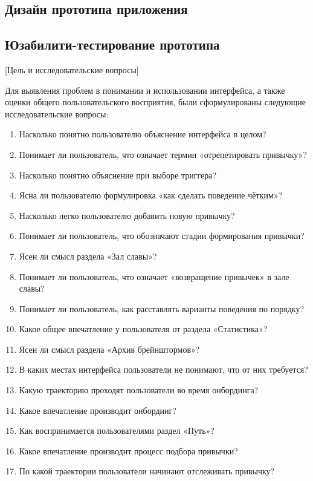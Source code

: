 \documentclass[pdflatex,sn-mathphys-num]{sn-jnl}%
\theoremstyle{thmstyleone}%
\theoremstyle{thmstyletwo}%
\theoremstyle{thmstylethree}%
\begin{document}
\subsection{Дизайн прототипа приложения}

\subsection{Юзабилити-тестирование прототипа}
[Цель и исследовательские вопросы]

Для выявления проблем в понимании и использовании интерфейса, а также оценки общего пользовательского восприятия, были сформулированы следующие исследовательские вопросы:

\begin{enumerate}
  \item Насколько понятно пользователю объяснение интерфейса в целом?
  \item Понимает ли пользователь, что означает термин «отрепетировать привычку»?
  \item Насколько понятно объяснение при выборе триггера?
  \item Ясна ли пользователю формулировка «как сделать поведение чётким»?
  \item Насколько легко пользователю добавить новую привычку?
  \item Понимает ли пользователь, что обозначают стадии формирования привычки?
  \item Ясен ли смысл раздела «Зал славы»?
  \item Понимает ли пользователь, что означает «возвращение привычек» в зале славы?
  \item Понимает ли пользователь, как расставлять варианты поведения по порядку?
  \item Какое общее впечатление у пользователя от раздела «Статистика»?
  \item Ясен ли смысл раздела «Архив брейнштормов»?
  \item В каких местах интерфейса пользователи не понимают, что от них требуется?
  \item Какую траекторию проходят пользователи во время онбординга?
  \item Какое впечатление производит онбординг?
  \item Как воспринимается пользователями раздел «Путь»?
  \item Какое впечатление производит процесс подбора привычки?
  \item По какой траектории пользователи начинают отслеживать привычку?

\end{enumerate}
\end{document}
